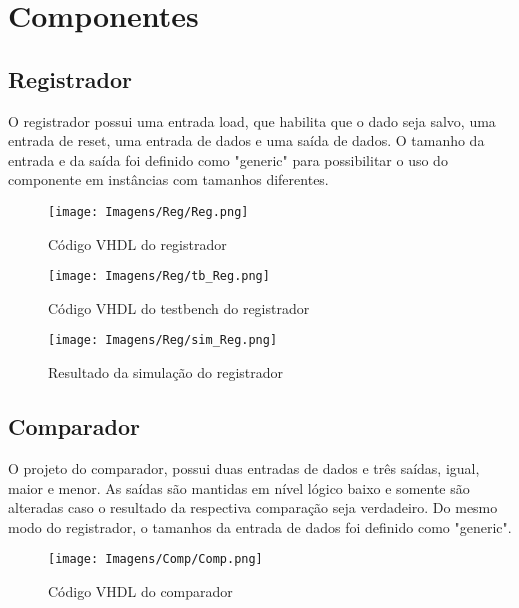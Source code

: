 \documentclass[12pt,a4paper,oneside]{abntex2}
\begin{document}
        \section{Componentes}
            \subsection{Registrador}
                O registrador possui uma entrada load, que habilita que o dado seja salvo, uma entrada de reset, uma entrada de dados e uma saída de dados. O tamanho da entrada e da saída foi definido como "generic" para possibilitar o uso do componente em instâncias com tamanhos diferentes.

                \begin{figure}[H]
                    \centering
                    \texttt{[image: Imagens/Reg/Reg.png]}
                    \caption{Código VHDL do registrador}
                    \label{fig:Reg}
                \end{figure}

                \begin{figure}[H]
                    \centering
                    \texttt{[image: Imagens/Reg/tb\_Reg.png]}
                    \caption{Código VHDL do testbench do registrador}
                    \label{fig:tb_Reg}
                \end{figure}

                \begin{figure}[H]
                    \centering
                    \texttt{[image: Imagens/Reg/sim\_Reg.png]}
                    \caption{Resultado da simulação do registrador}
                    \label{fig:sim_Reg}
                \end{figure}

            \subsection{Comparador}
                O projeto do comparador, possui duas entradas de dados e três saídas, igual, maior e menor. As saídas são mantidas em nível lógico baixo e somente são alteradas caso o resultado da respectiva comparação seja verdadeiro. Do mesmo modo do registrador, o tamanhos da entrada de dados foi definido como "generic".

                \begin{figure}[H]
                    \centering
                    \texttt{[image: Imagens/Comp/Comp.png]}
                    \caption{Código VHDL do comparador}
                    \label{fig:Comp}
                \end{figure}
\end{document}

